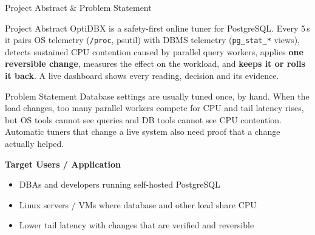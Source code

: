 \documentclass[aspectratio=169,11pt]{beamer}
\begin{document}
\begin{frame}{Project Abstract \& Problem Statement}

\begin{block}{Project Abstract}
\small
OptiDBX is a safety-first online tuner for PostgreSQL. Every 5\,s it pairs
OS telemetry (\texttt{/proc}, psutil) with DBMS telemetry
(\texttt{pg\_stat\_*} views), detects sustained CPU contention caused by
parallel query workers, applies \textbf{one reversible change}, measures the
effect on the workload, and \textbf{keeps it or rolls it back}. A live
dashboard shows every reading, decision and its evidence.
\end{block}

\vspace{1mm}

\begin{block}{Problem Statement}
\small
Database settings are usually tuned once, by hand. When the load changes,
too many parallel workers compete for CPU and tail latency rises, but OS tools
cannot see queries and DB tools cannot see CPU contention. Automatic tuners
that change a live system also need proof that a change actually helped.
\end{block}

\vspace{1mm}

\textbf{\color{GEUBlue}Target Users / Application}

\begin{itemize}\itemsep1pt\small
    \item DBAs and developers running self-hosted PostgreSQL
    \item Linux servers / VMs where database and other load share CPU
    \item Lower tail latency with changes that are verified and reversible
\end{itemize}

\end{frame}
\end{document}
